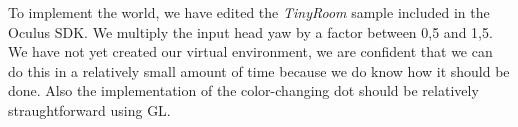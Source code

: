 To implement the world, we have edited the \textit{TinyRoom} sample included in the Oculus SDK. 
We multiply the input head yaw by a factor between 0,5 and 1,5.
We have not yet created our virtual environment, we are confident that we can do this in a relatively small amount of time because we do know how it should be done.
Also the implementation of the color-changing dot should be relatively straughtforward using GL.


